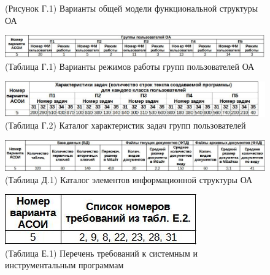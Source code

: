 \documentclass[12pt, a4paper, simple]{eskdtext}
\begin{document}
    \begin{figure}[h!]
        \centering
        \caption{(Рисунок Г.1) Варианты общей модели функциональной структуры ОА}
    \end{figure}

    \begin{figure}[h!]
        \centering
        \includegraphics[width=16cm]
            {_docs/ВариантыРежимовРаботыГруппПользователейОА.jpg}
        \caption{(Таблица Г.1) Варианты режимов работы групп пользователей ОА}
    \end{figure}

    \begin{figure}[h!]
        \centering
        \includegraphics[width=16cm]
            {_docs/КаталогХарактеристикЗадачГруппПользователей.jpg}
        \caption{(Таблица Г.2) Каталог характеристик задач групп пользователей}
    \end{figure}

    \begin{figure}[ph!]
        \centering
        \includegraphics[width=16cm]
            {_docs/КаталогЭлементовИнформационнойСтруктурыОА.jpg}
        \caption{(Таблица Д.1) Каталог элементов информационной структуры ОА}
    \end{figure}

    \begin{figure}[ph!]
        \centering
        \includegraphics[]
            {_docs/ПереченьТребованийКСистемнымИИнструментальнымПрограммам.jpg}
        \caption{(Таблица Е.1) Перечень требований к системным и инструментальным программам}
    \end{figure}
\end{document}

